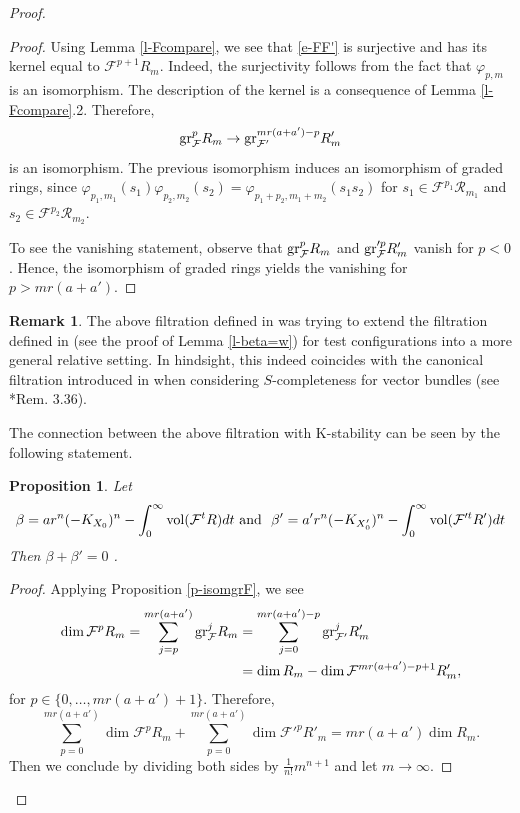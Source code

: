 \documentclass[12pt,reqno]{amsart}%
\newcommand{\cR}{{\mathcal{R}}}
\newcommand{\cF}{\mathcal{F}}
\newcommand{\gr}{{\rm gr}}
\newtheorem{prop}[thm]{Proposition}
\theoremstyle{definition}
\newtheorem{rem}[thm]{Remark}
\theoremstyle{remark}
\newcommand{\vol}{{\rm vol}}
\begin{document}
\begin{proof}
\begin{proof}
Using Lemma \ref{l-Fcompare}, we see that \eqref{e-FF'} is surjective and has its kernel equal to $\cF^{p+1} R_m$. Indeed, the surjectivity follows from the fact that $\varphi_{p,m}$ is an isomorphism. The description of the kernel is a consequence of Lemma \ref{l-Fcompare}.2. Therefore, 
$$\gr_{\cF}^p R_m \to \gr_{\cF'}^{mr(a+a')-p} R'_m$$ 
is an isomorphism. The previous  isomorphism induces an isomorphism of graded rings, since $\varphi_{p_1,m_1}(s_1)  \varphi_{p_2,m_2}(s_2)  = \varphi_{p_1+p_2,m_1+m_2}(s_1  s_2)$ for $s_1\in \cF^{p_1}\cR_{m_1}$ and $s_2 \in \cF^{p_2} \cR_{m_2}$.  

To see the vanishing statement, observe that 
 $ {\rm gr}_\cF^p R_m$ and ${\rm gr}_\cF'^pR'_m$ vanish for $p<0$. Hence, the isomorphism of graded rings yields the 
 vanishing for $p>mr(a+a')$. 
 \end{proof}



\begin{rem}\label{r-filtrationcoincide}
The above filtration defined in \cite{BX19} was trying to extend the filtration defined in \cite{BHJ17} (see the proof of  Lemma \ref{l-beta=w}) for test configurations into a more general relative setting. 
In hindsight, this indeed coincides with the canonical filtration introduced in \cite{AHH18} when considering $S$-completeness for vector bundles (see \cite{AHH18}*{Rem. 3.36}). \end{rem}

The connection between the above filtration with K-stability can be seen by the following statement.



\begin{prop}\label{p-TSa}Let 
\[
\beta=ar^n(-K_{X_0})^n-\int^{\infty}_{0} \vol(\cF^tR) dt \mbox{\  and \  } \beta'=a'r^n(-K_{X'_0})^n-\int^{\infty}_{0} \vol(\cF'^tR') dt
\]
Then
$\beta + \beta' = 0$ .
\end{prop}

\begin{proof}
Applying Proposition \ref{p-isomgrF}, we see 
\begin{align*}
\dim \cF^p R_m = \sum_{j=p}^{mr(a+a')} \gr_{\cF}^j R_m 
			&= \sum_{j=0}^{mr(a+a')-p} \gr_{\cF'}^{j} R'_m \\
			& = \dim R_m  - \dim \cF^{mr(a+a')-p+1}R'_m ,
\end{align*} 
for  $p \in \{0, \ldots , mr(a+a')+1\}$.
Therefore, 
\[
\sum_{p=0 }^{mr(a+a')} \dim \cF^p R_m
+
\sum_{p=0 }^{mr(a+a')} \dim \cF'^p R'_m
=mr(a+a') \dim R_m
.\]
Then we conclude by dividing both sides by $\frac{1}{n!}m^{n+1}$ and let $m\to \infty$.  \end{proof}


\end{proof}
\end{document}
